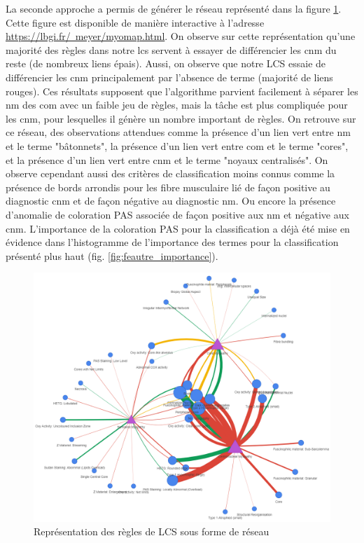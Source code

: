 La seconde approche a permis de générer le réseau représenté dans la figure \ref{fig:network}. Cette figure est disponible de manière interactive à l'adresse \href{https://lbgi.fr/~meyer/myomap.html}{https://lbgi.fr/~meyer/myomap.html}. On observe sur cette représentation qu'une majorité des règles dans notre \gls{lcs} servent à essayer de différencier les \gls{cnm} du reste (de nombreux liens épais). Aussi, on observe que notre LCS essaie de différencier les \gls{cnm} principalement par l'absence de terme (majorité de liens rouges). Ces résultats supposent que l'algorithme parvient facilement à séparer les \gls{nm} des \gls{com} avec un faible jeu de règles, mais la tâche est plus compliquée pour les \gls{cnm}, pour lesquelles il génère un nombre important de règles. On retrouve sur ce réseau, des observations attendues comme la présence d'un lien vert entre \gls{nm} et le terme "bâtonnets", la présence d'un lien vert entre \gls{com} et le terme "cores", et la présence d'un lien vert entre \gls{cnm} et le terme "noyaux centralisés". On observe cependant aussi des critères de classification moins connus comme la présence de bords arrondis pour les fibre musculaire lié de façon positive au diagnostic \gls{cnm} et de façon négative au diagnostic \gls{nm}. Ou encore la présence d'anomalie de coloration PAS associée de façon positive aux \gls{nm} et négative aux \gls{cnm}. L'importance de la coloration PAS pour la classification a déjà été mise en évidence dans l'histogramme de l'importance des termes pour la classification présenté plus haut (fig. \ref{fig:feautre_importance}).
\begin{figure}[!ht]
  \centering
  \includegraphics[width=1\textwidth]{figures/network_lcs.png}
  \caption[Représentation des règles de LCS sous forme de réseau]{Représentation des règles de LCS sous forme de réseau}
  \label{fig:network}
\end{figure}
